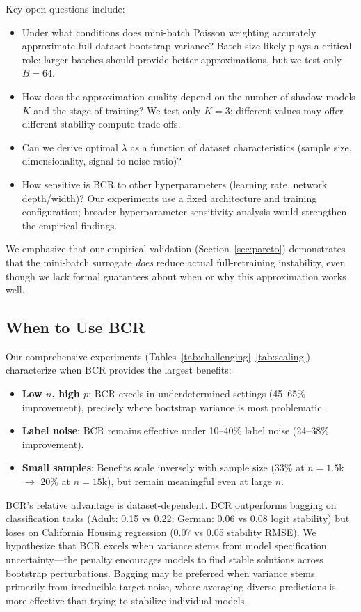 \documentclass[12pt, letterpaper]{article}
\begin{document}
Key open questions include:
\begin{itemize}
\item Under what conditions does mini-batch Poisson weighting accurately approximate full-dataset bootstrap variance? Batch size likely plays a critical role: larger batches should provide better approximations, but we test only $B=64$.
\item How does the approximation quality depend on the number of shadow models $K$ and the stage of training? We test only $K=3$; different values may offer different stability-compute trade-offs.
\item Can we derive optimal $\lambda$ as a function of dataset characteristics (sample size, dimensionality, signal-to-noise ratio)?
\item How sensitive is BCR to other hyperparameters (learning rate, network depth/width)? Our experiments use a fixed architecture and training configuration; broader hyperparameter sensitivity analysis would strengthen the empirical findings.
\end{itemize}

We emphasize that our empirical validation (Section~\ref{sec:pareto}) demonstrates that the mini-batch surrogate \emph{does} reduce actual full-retraining instability, even though we lack formal guarantees about when or why this approximation works well.

\subsection{When to Use BCR}

Our comprehensive experiments (Tables~\ref{tab:challenging}--\ref{tab:scaling}) characterize when BCR provides the largest benefits:

\begin{itemize}
\item \textbf{Low $n$, high $p$}: BCR excels in underdetermined settings (45--65\% improvement), precisely where bootstrap variance is most problematic.
\item \textbf{Label noise}: BCR remains effective under 10--40\% label noise (24--38\% improvement).
\item \textbf{Small samples}: Benefits scale inversely with sample size (33\% at $n=1.5$k $\rightarrow$ 20\% at $n=15$k), but remain meaningful even at large $n$.
\end{itemize}

BCR's relative advantage is dataset-dependent. BCR outperforms bagging on classification tasks (Adult: 0.15 vs 0.22; German: 0.06 vs 0.08 logit stability) but loses on California Housing regression (0.07 vs 0.05 stability RMSE). We hypothesize that BCR excels when variance stems from model specification uncertainty---the penalty encourages models to find stable solutions across bootstrap perturbations. Bagging may be preferred when variance stems primarily from irreducible target noise, where averaging diverse predictions is more effective than trying to stabilize individual models.
\end{document}

